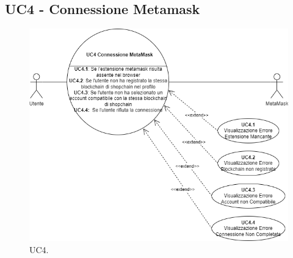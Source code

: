 \subsection{UC4 - Connessione Metamask}

\begin{figure}[H]
    \centering
    \includegraphics[scale=0.7]{immagini/UseCases-UC4.png}
    \caption{UC4.}
\end{figure}

